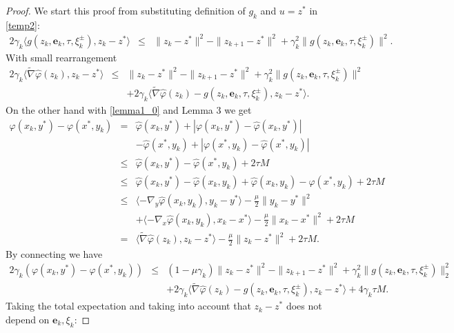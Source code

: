 \documentclass[runningheads]{llncs}
\def\la{\langle}
\def\ra{\rangle}
\begin{document}
\begin{proof}
We start this proof from substituting definition of $g_k$ and $u = z^*$ in \eqref{temp2}:
\begin{eqnarray*}
    2\gamma_k\langle g(z_k, \mathbf{e}_k, \tau,  \xi^{\pm}_k) , z_{k} - z^*\rangle &\leq&
    \|z_k - z^*\|^2 - \|z_{k+1} - z^*\|^2 + \gamma^2_k\| g(z_k, \mathbf{e}_k, \tau,  \xi^{\pm}_k) \|^2.
\end{eqnarray*}
With small rearrangement
\begin{eqnarray*}
    2\gamma_k \langle \tilde \nabla \hat\varphi(z_k) , z_{k} - z^*\rangle
    &\leq&
    \|z_k - z^*\|^2 - \|z_{k+1} - z^*\|^2 + \gamma^2_k\| g(z_k, \mathbf{e}_k, \tau,  \xi^{\pm}_k) \|^2 \\
    &&+ 2\gamma_k\langle \tilde \nabla \hat{\varphi}(z_k) - g(z_k, \mathbf{e}_k, \tau,  \xi^{\pm}_k) , z_{k} - z^*\rangle.
\end{eqnarray*}
On the other hand with \eqref{lemma1_0} and Lemma 3 we get
\begin{eqnarray*}
    \varphi(x_k, y^*) - \varphi(x^*, y_k) &=& \hat \varphi(x_k, y^*) + |\varphi(x_k, y^*) - \hat \varphi(x_k, y^*)| \\
    &&- \hat \varphi(x^*, y_k) + |\varphi(x^*, y_k) - \hat \varphi(x^*, y_k)|   \\
    &\leq & \hat \varphi(x_k, y^*) - \hat \varphi(x^*, y_k) + 2\tau M\\
    &\leq & \hat \varphi(x_k, y^*) - \hat \varphi(x_k, y_k) + \hat \varphi(x_k, y_k) - \hat \varphi(x^*, y_k) + 2\tau M\\
    &\leq & \la -\nabla_y \hat\varphi(x_k,y_k), y_k-y^*\ra - \frac{\mu}{2} \|y_k-y^* \|^2 \\
    &&+  \la -\nabla_x \hat\varphi(x_k,y_k), x_k-x^*\ra - \frac{\mu}{2} \|x_k-x^* \|^2 + 2\tau M \\
   & = & \la \widetilde{\nabla} \hat\varphi(z_k), z_k-z^*\ra - \frac{\mu}{2} \|z_k-z^* \|^2 + 2\tau M.
\end{eqnarray*}
By connecting we have
\begin{eqnarray*}
    2\gamma_k (\varphi(x_k, y^*) - \varphi(x^*, y_k))
    &\leq&
    (1- \mu\gamma_k)\|z_k - z^*\|^2 - \|z_{k+1} - z^*\|^2 + \gamma^2_k\| g(z_k, \mathbf{e}_k, \tau,  \xi^{\pm}_k) \|^2_2 \\
    &&+ 2\gamma_k\langle \tilde \nabla \hat{\varphi}(z_k) - g(z_k, \mathbf{e}_k, \tau,  \xi^{\pm}_k) , z_{k} - z^*\rangle + 4 \gamma_k\tau M.
\end{eqnarray*}
Taking the total expectation and taking into account that $z_{k} - z^*$ does not depend on $\mathbf{e}_k, \xi_k$:

\end{proof}
\end{document}
